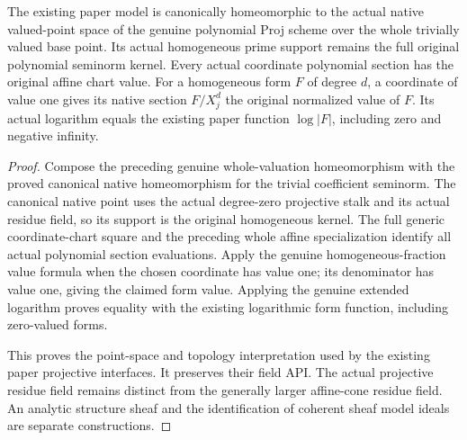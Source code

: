 \begin{theorem}
\label{projective:paper-native-projective-homeomorphism}
\leanok
{}
The existing paper model is canonically homeomorphic to the actual native
valued-point space of the genuine polynomial Proj scheme over the whole
trivially valued base point. Its actual homogeneous prime support remains
the full original polynomial seminorm kernel. Every actual coordinate
polynomial section has the original affine chart value. For a homogeneous
form $F$ of degree $d$, a coordinate of value one gives its native section
$F/X_j^d$ the original normalized value of $F$. Its actual logarithm
equals the existing paper function
$\log|F|$, including zero and negative infinity.
\end{theorem}
\begin{proof}
Compose the preceding genuine whole-valuation homeomorphism with the
proved canonical native homeomorphism for the trivial coefficient
seminorm. The canonical native point uses the actual degree-zero
projective stalk and its actual residue field, so its support is the
original homogeneous kernel. The full generic coordinate-chart square
and the preceding whole affine specialization identify all actual
polynomial section evaluations. Apply the genuine homogeneous-fraction
value formula when the chosen coordinate has value one; its denominator
has value one, giving the claimed form value. Applying the genuine
extended logarithm proves equality with the existing logarithmic form
function, including zero-valued forms.

This proves the point-space and topology interpretation used by the
existing paper projective interfaces. It preserves their field API. The
actual projective residue field remains distinct from the generally
larger affine-cone residue field. An analytic structure sheaf and the
identification of coherent sheaf model ideals are separate constructions.
\end{proof}
